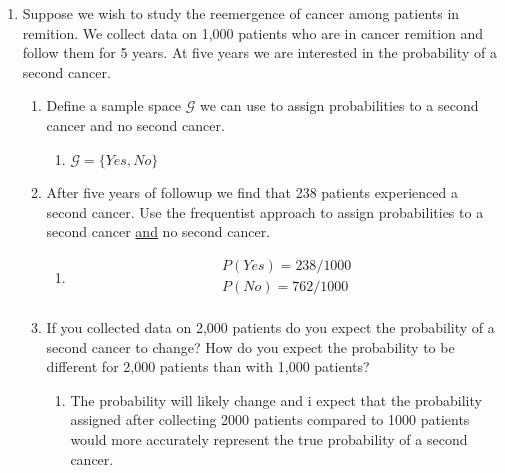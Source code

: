 \documentclass[krantz1,ChapterTOCs]{krantz}
\begin{document}
\begin{enumerate}
    \item Suppose we wish to study the reemergence of cancer among patients in remition. We collect data on 1,000 patients who are in cancer remition and follow them for 5 years. At five years we are interested in the probability of a second cancer. 
    \begin{enumerate}
        \item Define a sample space $\mathcal{G}$ we can use to assign probabilities to a second cancer and no second cancer.
            \begin{enumerate}
                \item {\color{red} $\mathcal{G} = \{ Yes, No\}$ }
            \end{enumerate}
        
        \item After five years of followup we find that 238 patients experienced a second cancer. Use the frequentist approach to assign probabilities to a second cancer \underline{and} no second cancer.
            \begin{enumerate}
                \item {\color{red}
                \begin{align*}
                    P(Yes) = 238/1000\\
                    P(No) = 762/1000\\
                \end{align*}
                
                }
            \end{enumerate}
        
        \item If you collected data on 2,000 patients do you expect the probability of a second cancer to change? How do you expect the probability to be different for 2,000 patients than with 1,000 patients? 
            \begin{enumerate}
                \item {\color{red} The probability will likely change and i expect that the probability assigned after collecting 2000 patients compared to 1000 patients would more accurately represent the true probability of a second cancer. }
            \end{enumerate}
        
    \end{enumerate}
    

\end{enumerate}
\end{document}
